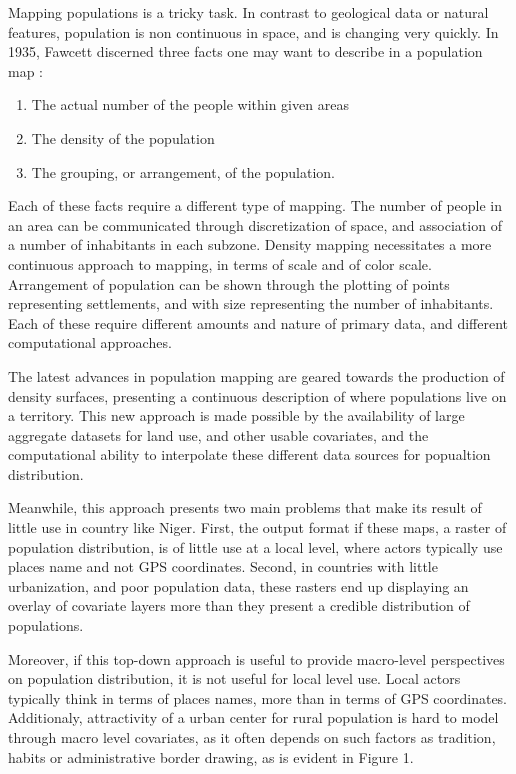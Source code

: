 \documentclass[12pt]{article}\usepackage[]{graphicx}\usepackage[]{color}
\begin{document}
Mapping populations is a tricky task. In contrast to geological data or natural features, population is non continuous in space, and is changing very quickly. In 1935, Fawcett discerned three facts one may want to describe in a population map\cite{fawcett1935population} :
\begin{enumerate}
	\item The actual number of the people within given areas
	\item The density of the population
	\item The grouping, or arrangement, of the population.
\end{enumerate}
Each of these facts require a different type of mapping. The number of people in an area can be communicated through discretization of space, and association of a number of inhabitants in each subzone. Density mapping necessitates a more continuous approach to mapping, in terms of scale and of color scale. Arrangement of population can be shown through the plotting of points representing settlements, and with size representing the number of inhabitants. Each of these require different amounts and nature of primary data, and different computational approaches.

The latest advances in population mapping are geared towards the production of density surfaces, presenting a continuous description of where populations live on a territory\cite{linard2012population}. This new approach is made possible by the availability of large aggregate datasets for land use, and other usable covariates\cite{linard2011assessing}, and the computational ability to interpolate these  different data sources for popualtion distribution\cite{stevens2015disaggregating}.

Meanwhile, this approach presents two main problems that make its result of little use in country like Niger. First, the output format if these maps, a raster of population distribution, is of little use at a local level, where actors typically use places name and not GPS coordinates. Second, in countries with little urbanization, and poor population data, these rasters end up displaying an overlay of covariate layers more than they present a credible distribution of populations.

Moreover, if this top-down approach is useful to provide macro-level perspectives on population distribution, it is not useful for local level use. Local actors typically think in terms of places names, more than in terms of GPS coordinates. Additionaly, attractivity of a urban center for rural population is hard to model through macro level covariates, as it often depends on such factors as tradition, habits or administrative border drawing, as is evident in Figure 1.
\end{document}
